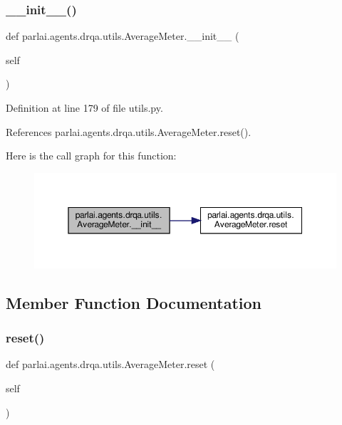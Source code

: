 \subsubsection{\texorpdfstring{\+\_\+\+\_\+init\+\_\+\+\_\+()}{\_\_init\_\_()}}
{\footnotesize\ttfamily def parlai.\+agents.\+drqa.\+utils.\+Average\+Meter.\+\_\+\+\_\+init\+\_\+\+\_\+ (\begin{DoxyParamCaption}\item[{}]{self }\end{DoxyParamCaption})}



Definition at line 179 of file utils.\+py.



References parlai.\+agents.\+drqa.\+utils.\+Average\+Meter.\+reset().

Here is the call graph for this function\+:
\nopagebreak
\begin{figure}[H]
\begin{center}
\leavevmode
\includegraphics[width=350pt]{classparlai_1_1agents_1_1drqa_1_1utils_1_1AverageMeter_a5d31ec2b9b8020da43ab0ca600cbe561_cgraph}
\end{center}
\end{figure}


\subsection{Member Function Documentation}
\mbox{\label{classparlai_1_1agents_1_1drqa_1_1utils_1_1AverageMeter_adf03b2f21b820b30c0bf68334bda0b6e}} 
\subsubsection{\texorpdfstring{reset()}{reset()}}
{\footnotesize\ttfamily def parlai.\+agents.\+drqa.\+utils.\+Average\+Meter.\+reset (\begin{DoxyParamCaption}\item[{}]{self }\end{DoxyParamCaption})}



